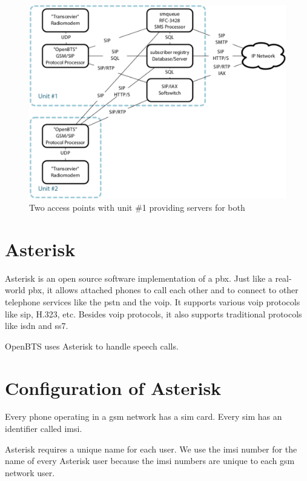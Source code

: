 \begin{figure}
  \centering
    \includegraphics[width=\textwidth]{../images/btsLarge}
  \caption[OpenBTS network with two access points]{Two access points with unit 
  \#1 providing servers for both \protect\cite{openbtsMan}}
  \label{fig:btsLarge}
\end{figure}


\section{Asterisk}
Asterisk is an open source software implementation of a \gls{pbx}. Just like 
a real-world \gls{pbx}, it allows attached phones to call
each other and to connect to other telephone services like the \gls{pstn} and the 
\gls{voip}. It supports various \gls{voip} protocols like \gls{sip},
H.323, etc. Besides \gls{voip} protocols, it also supports traditional protocols 
like \gls{isdn} and \gls{ss7}.

OpenBTS uses Asterisk to handle speech calls.

\section{Configuration of Asterisk}
Every phone operating in a \gls{gsm} network has a \gls{sim}
card. Every \gls{sim} has an identifier called \acrfull{imsi}.

Asterisk requires a unique name for each user. We use the \gls{imsi}
number for the name of every Asterisk user because the \gls{imsi} numbers are unique
to each \gls{gsm} network user.

